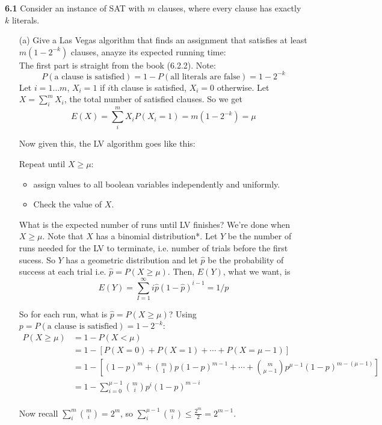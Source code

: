 \documentclass[10pt]{article}
\begin{document}
\textbf{6.1} 
\label{Q6.1}
Consider an instance of SAT with $m$ clauses, where every clause has
exactly $k$ literals.
\begin{enumerate}
\item[(a)]  Give a Las Vegas algorithm that finds an
assignment that satisfies at least $m(1-2^{-k})$ clauses, anayze its
expected running time:\\

The first part is straight from the book (6.2.2). Note:
$$P(\text{a clause is satisfied}) = 1 - P(\text{all literals are
  false}) = 1 - 2^{-k}$$
Let $i= 1\dots m$, $X_i = 1$ if $i$th clause is satisfied, $X_i=0$
otherwise. 
Let $X = \sum_{i}^m X_i$, the total number of satisfied clauses.
So we get $$E(X) = \sum_i^m X_iP(X_i=1) = m(1-2^{-k}) = \mu$$

Now given this, the LV algorithm goes like this:

Repeat until $X \ge \mu$:
\begin{itemize}
\item assign values to all boolean variables independently and uniformly.
\item Check the value of $X$.
\end{itemize}

What is the expected number of runs until LV finishes? We're done
when $X \ge \mu$. Note that $X$
has a binomial distribution*. Let $Y$ be the number of runs needed for
the LV to terminate, i.e. number of trials before the first sucess. So
$Y$ has a geometric distribution and let $\hat{p}$ be the probability
of success at each trial i.e. $\hat{p} = P(X\ge \mu)$. Then, $E(Y)$, what we
want, is
\begin{equation}
  \label{eq:1}
E(Y) = \sum_{I=1}^\infty i\hat{p}(1-\hat{p})^{i-1} = 1/p
\end{equation}


So for each run, what is $\hat{p} = P(X\ge \mu)$? Using $p
= P(\text{a clause is satisfied}) = 1 - 2^{-k}$:
\begin{align*}
  P(X\ge \mu) &= 1 - P(X < \mu)\\
&= 1 - [ P(X=0) + P(X=1) + \cdots + P(X = \mu -1)]\\
&= 1 - [(1-p)^m + {m \choose 1}p(1-p)^{m-1} + \cdots + {m
 \choose \mu - 1} p^{\mu-1}(1-p)^{m -(\mu -1)}]\\
&= 1 - \sum_{i=0}^{\mu-1}{m \choose i}p^i(1-p)^{m-i}\\
\end{align*}

Now recall $\sum_i^m{m \choose i} = 2^m$, so $\sum_i^{\mu -1} {m
  \choose i} \le \frac{2^m}{2} = 2^{m-1}$. 


\end{enumerate}
\end{document}
